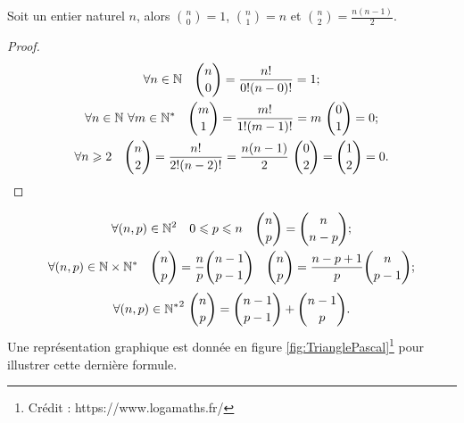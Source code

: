 \begin{prop}
  Soit un entier naturel \(n\), alors \(\binom{n}{0}=1\), \(\binom{n}{1}=n\) et 
  \(\binom{n}{2}=\frac{n(n - 1)}{2}\).
\end{prop}

\begin{proof}
  \begin{gather}
    \forall n \in \N \quad \binom{n}{0}=\frac{n!}{0!(n - 0)!}=1; \\
    \forall n \in \N \ \forall m\in \N^* \quad 
    \binom{m}{1}=\frac{m!}{1!(m - 1)!}=m \ \binom{0}{1}=0;\\
    \forall n \geqslant 2 \quad 
    \binom{n}{2}=\frac{n!}{2!(n - 2)!}=\frac{n(n - 1)}{2} \ 
    \binom{0}{2}=\binom{1}{2}=0.
  \end{gather}
\end{proof}

\begin{prop}
  \begin{gather}
    \forall (n, p)\in\mathbb{N}^2 \quad 0\leqslant p \leqslant n \quad 
    \binom{n}{p}=\binom{n}{n - p};\\
    \forall (n, p)\in\mathbb{N}\times\mathbb{N}^* \quad \binom{n}{p} = \frac{n}{p}\binom{n - 1}{p - 1} 
    \quad \binom{n}{p} = \frac{n - p + 1}{p}\binom{n}{p - 1};
  \end{gather}
  \begin{equation}
    \label{eq:TrianglePascal}
    \forall (n, p)\in{\mathbb{N}^*}^2 \ \binom{n}{p} = \binom{n - 1}{p - 1} + \binom{n - 1}{p}.
  \end{equation}
  Une représentation graphique est donnée en figure
  \ref{fig:TrianglePascal}\footnote{Crédit : https://www.logamaths.fr/} pour 
  illustrer cette dernière formule.
\end{prop}

